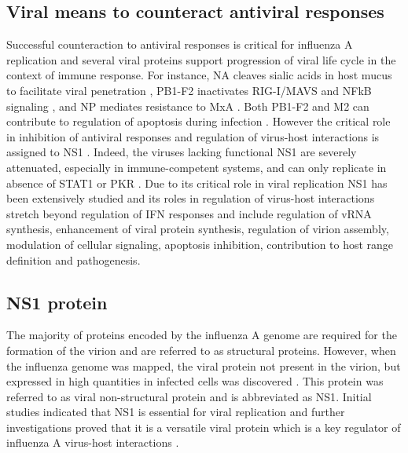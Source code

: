 		
	\subsection{Viral means to counteract antiviral responses}
	
	Successful counteraction to antiviral responses is critical for influenza A replication and several viral proteins support progression of viral life cycle in the context of immune response. For instance, \gls{NA} cleaves sialic acids in host mucus to facilitate viral penetration \parencite{Cohen2013}, \gls{PB1}-F2 inactivates \gls{RIG-I}/\gls{MAVS} and \gls{NFkB} signaling \parencite{Varga2011a, Dudek2011, Reis2013}, and \gls{NP} mediates resistance to \gls{MxA} \parencite{Dittmann2008}. Both \gls{PB1}-F2 and \gls{M2} can contribute to regulation of apoptosis during infection \parencite{Herold2012}. However the critical role in inhibition of antiviral responses and regulation of virus-host interactions is assigned to \gls{NS1} \parencite{Garcia-Sastre1998}. Indeed, the viruses lacking functional \gls{NS1} are severely attenuated, especially in immune-competent systems, and can only replicate in absence of \gls{STAT}1 or \gls{PKR} \parencite{Garcia-Sastre1998, Egorov1998, Donelan2003, Falcon2004}. Due to its critical role in viral replication \gls{NS1} has been extensively studied and its roles in regulation of virus-host interactions stretch beyond regulation of \gls{IFN} responses and include regulation of vRNA synthesis, enhancement of viral protein synthesis, regulation of virion assembly, modulation of cellular signaling, apoptosis inhibition, contribution to host range definition and pathogenesis. 
		
	\subsection{NS1 protein}
		
		The majority of proteins encoded by the influenza A genome are required for the formation of the virion and are referred to as structural proteins. However, when the influenza genome was mapped, the viral protein not present in the virion, but expressed in high quantities in infected cells was discovered \parencite{Ritchey1976}. This protein was referred to as viral non-structural protein and is abbreviated as \gls{NS1}. Initial studies indicated that \gls{NS1} is essential for viral replication \parencite{Koennecke1981} and further investigations proved that it is a versatile viral protein which is a key regulator of influenza A virus-host interactions \parencite{Ayllon2015}.
		
